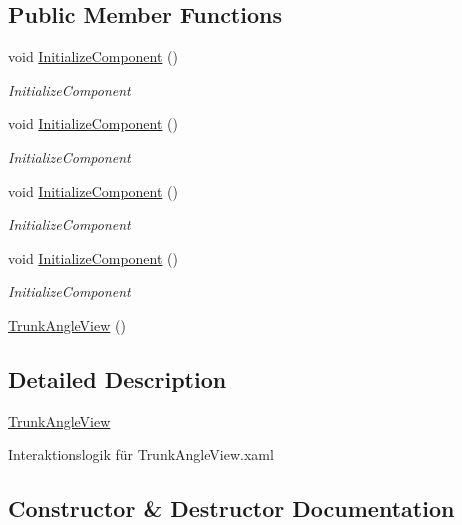 \subsection*{Public Member Functions}
\begin{DoxyCompactItemize}
\item 
void \hyperlink{class_rowing_monitor_1_1_view_1_1_trunk_angle_view_a0bb4fedfe9f2b058a0ee1ae5841242ce}{Initialize\+Component} ()
\begin{DoxyCompactList}\small\item\em Initialize\+Component \end{DoxyCompactList}\item 
void \hyperlink{class_rowing_monitor_1_1_view_1_1_trunk_angle_view_a0bb4fedfe9f2b058a0ee1ae5841242ce}{Initialize\+Component} ()
\begin{DoxyCompactList}\small\item\em Initialize\+Component \end{DoxyCompactList}\item 
void \hyperlink{class_rowing_monitor_1_1_view_1_1_trunk_angle_view_a0bb4fedfe9f2b058a0ee1ae5841242ce}{Initialize\+Component} ()
\begin{DoxyCompactList}\small\item\em Initialize\+Component \end{DoxyCompactList}\item 
void \hyperlink{class_rowing_monitor_1_1_view_1_1_trunk_angle_view_a0bb4fedfe9f2b058a0ee1ae5841242ce}{Initialize\+Component} ()
\begin{DoxyCompactList}\small\item\em Initialize\+Component \end{DoxyCompactList}\item 
\hyperlink{class_rowing_monitor_1_1_view_1_1_trunk_angle_view_a4a7e7129a25cf8a329e1b0744594f436}{Trunk\+Angle\+View} ()
\end{DoxyCompactItemize}


\subsection{Detailed Description}
\hyperlink{class_rowing_monitor_1_1_view_1_1_trunk_angle_view}{Trunk\+Angle\+View} 

Interaktionslogik für Trunk\+Angle\+View.\+xaml 

\subsection{Constructor \& Destructor Documentation}
\mbox{\label{class_rowing_monitor_1_1_view_1_1_trunk_angle_view_a4a7e7129a25cf8a329e1b0744594f436}} 
